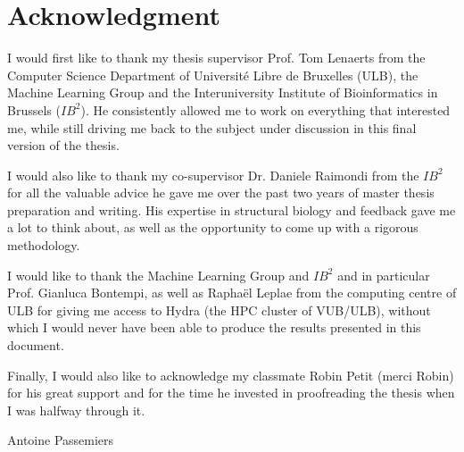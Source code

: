 \chapter*{Acknowledgment}

\thispagestyle{empty}

\noindent I would first like to thank my thesis supervisor Prof. Tom Lenaerts from
the Computer Science Department of Université Libre de Bruxelles (ULB),
the Machine Learning Group and the Interuniversity Institute of
Bioinformatics in Brussels ($IB^2$).
He consistently allowed me to work on everything that interested me,
while still driving me back to the subject under discussion in this final
version of the thesis.

\vspace{0.5cm}

\noindent I would also like to thank my co-supervisor Dr. Daniele Raimondi from
the $IB^2$ for all the valuable advice he gave me over the past two years
of master thesis preparation and writing. His expertise in structural
biology and feedback gave me a lot to think about, as well as the opportunity
to come up with a rigorous methodology.

\vspace{0.5cm}

\noindent I would like to thank the Machine Learning Group and $IB^2$ and in particular
Prof. Gianluca Bontempi, as well as Raphaël Leplae from the computing centre
of ULB for giving me access to Hydra (the HPC cluster of VUB/ULB), without
which I would never have been able to produce the results presented in this
document.

\vspace{0.5cm}

\noindent Finally, I would also like to acknowledge my classmate Robin Petit (merci Robin)
for his great support and for the time he invested in proofreading
the thesis when I was halfway through it. 

\vspace{1cm}

Antoine Passemiers
